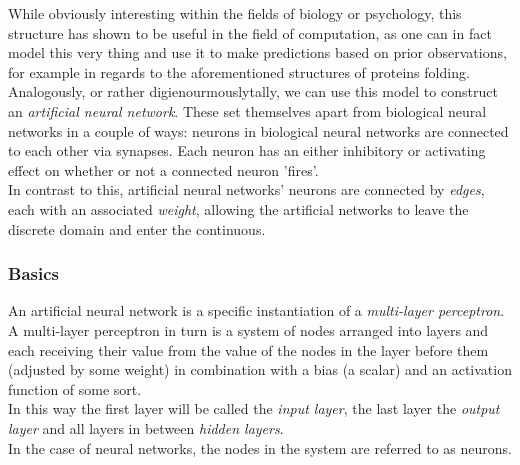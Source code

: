 \noindent While obviously interesting within the fields of biology or psychology, this structure has shown 
to be useful in the field of computation, as one can in fact model this very 
thing and use it to make predictions based on prior observations, for example in regards to the 
aforementioned structures of proteins folding.\\
Analogously, or rather digienourmouslytally, we can use this model to construct an \textit{artificial 
neural network}.
These set themselves apart from biological neural networks in a couple of ways: neurons in biological neural networks are connected to each other via synapses. Each neuron has an either inhibitory or activating effect on whether or not a connected neuron 'fires'.\\
In contrast to this, artificial neural networks' neurons are connected by \textit{edges}, each with an associated \textit{weight}, allowing the artificial networks to leave the discrete domain and enter the continuous.

\subsubsection{Basics}
An artificial neural network is a specific instantiation of a \textit{multi-layer perceptron}.
A multi-layer perceptron in turn is a system of nodes arranged into layers and each receiving their value from the value of the nodes in the layer before them (adjusted by some weight) in combination with a bias (a scalar) and an activation function of some sort. \\
In this way the first layer will be called the \textit{input layer}, the last layer the \textit{output layer} and all layers in between \textit{hidden layers}. \\
In the case of neural networks, the nodes in the system are referred to as neurons.

